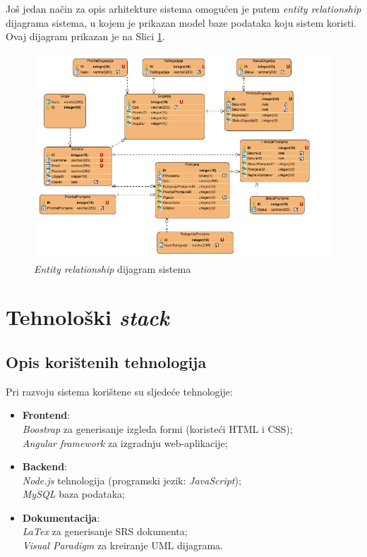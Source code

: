 \documentclass[12pt,a4paper]{article}
\begin{document}
Još jedan način za opis arhitekture sistema omogućen je putem \textit{entity relationship} dijagrama sistema, u kojem je prikazan model baze podataka koju sistem koristi. Ovaj dijagram prikazan je na Slici \ref{erd}.

\begin{figure}[H]
\center
\includegraphics[scale=0.5]{../res/erd.JPG}
\caption{\textit{Entity relationship} dijagram sistema}
\label{erd}
\end{figure}

\newpage

\section{Tehnološki \textit{stack}}

\subsection{Opis korištenih tehnologija}

Pri razvoju sistema korištene su sljedeće tehnologije:

\begin{itemize}
\item \textbf{Frontend}: \\
\textit{Boostrap} za generisanje izgleda formi (koristeći HTML i CSS); \\
\textit{Angular framework} za izgradnju web-aplikacije;
\item \textbf{Backend}: \\
\textit{Node.js} tehnologija (programski jezik: \textit{JavaScript}); \\
\textit{MySQL} baza podataka;
\item \textbf{Dokumentacija}: \\
\textit{LaTex} za generisanje SRS dokumenta; \\
\textit{Visual Paradigm} za kreiranje UML dijagrama.
\end{itemize}
\end{document}
